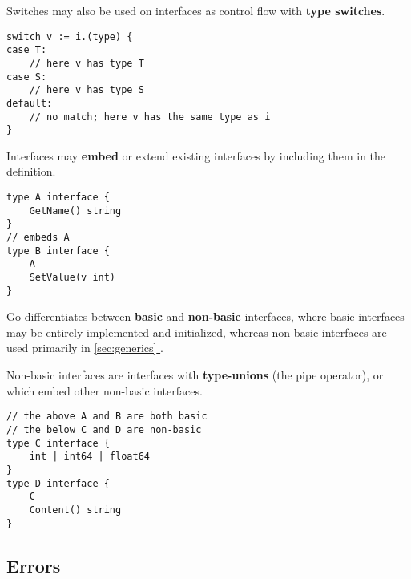 \documentclass{article}
\newcommand{\fullref}[1]{\hyperref[{#1}]{\ref{#1} \nameref{#1}}}
\begin{document}
\begin{paracol}{2}
\noindent Switches may also be used on interfaces as control flow with \textbf{type switches}.

\switchcolumn
\begin{lstlisting}
switch v := i.(type) {
case T:
    // here v has type T
case S:
    // here v has type S
default:
    // no match; here v has the same type as i
}
\end{lstlisting}

\switchcolumn*

\noindent Interfaces may \textbf{embed} or extend existing interfaces by including them in the definition.

\switchcolumn

\begin{lstlisting}
type A interface {
    GetName() string
}
// embeds A
type B interface {
    A
    SetValue(v int)
}
\end{lstlisting}

\switchcolumn*

\noindent Go differentiates between \textbf{basic} and \textbf{non-basic} interfaces, where basic interfaces may be entirely implemented and initialized, whereas non-basic interfaces are used primarily in \fullref{sec:generics}.

Non-basic interfaces are interfaces with \textbf{type-unions} (the pipe operator), or which embed other non-basic interfaces.

\switchcolumn

\begin{lstlisting}
// the above A and B are both basic
// the below C and D are non-basic
type C interface {
    int | int64 | float64
}
type D interface {
    C
    Content() string
}
\end{lstlisting}

\end{paracol}

\subsection{Errors}
\end{document}
